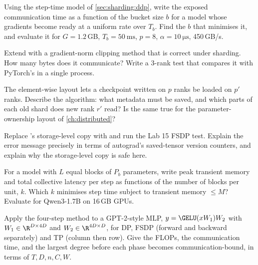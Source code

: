 \begin{exercise}
Using the step-time model of \cref{sec:sharding:ddp}, write the exposed communication time as a
function of the bucket size $b$ for a model whose gradients become ready at a uniform rate over
$T_b$. Find the $b$ that minimises it, and evaluate it for $G=1.2$\,GB, $T_b=\SI{50}{\milli\second}$,
$p=8$, $\alpha=\SI{10}{\micro\second}$, 450\,GB/s.
\end{exercise}

\begin{exercise}
Extend  with a gradient-norm clipping method that is correct
under sharding. How many bytes does it communicate? Write a 3-rank test that compares it with
PyTorch's  in a single process.
\end{exercise}

\begin{exercise}
The element-wise layout lets a checkpoint written on $p$ ranks be loaded on $p'$ ranks. Describe
the algorithm: what metadata must be saved, and which parts of each old shard does new rank $r'$
read? Is the same true for the parameter-ownership layout of \cref{ch:distributed}?
\end{exercise}

\begin{exercise}
Replace 's storage-level copy with  and run the
Lab 15 FSDP test. Explain the error message precisely in terms of autograd's saved-tensor version
counters, and explain why the storage-level copy is safe here.
\end{exercise}

\begin{exercise}
For a model with $L$ equal blocks of $P_b$ parameters, write peak transient memory and total
collective latency per step as functions of the number of blocks per unit, $k$. Which $k$
minimises step time subject to transient memory $\le M$? Evaluate for Qwen3-1.7B on 16\,GB GPUs.
\end{exercise}

\begin{exercise}
Apply the four-step method to a GPT-2-style MLP, $y = \GELU(xW_1)W_2$ with $W_1\in\R^{D\times4D}$ and
$W_2\in\R^{4D\times D}$, for DP, FSDP (forward and backward separately) and TP (column then row). Give
the FLOPs, the communication time, and the largest degree before each phase becomes
communication-bound, in terms of $T, D, n, C, W$.
\end{exercise}

